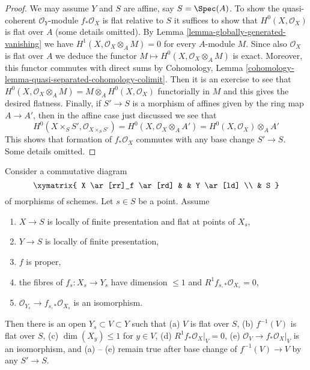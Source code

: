 \begin{proof}
We may assume $Y$ and $S$ are affine, say $S = \Spec(A)$.
To show the quasi-coherent $\mathcal{O}_Y$-module
$f_*\mathcal{O}_X$ is flat relative to $S$ it suffices
to show that $H^0(X, \mathcal{O}_X)$ is flat over $A$
(some details omitted).
By Lemma \ref{lemma-globally-generated-vanishing} we have
$H^1(X, \mathcal{O}_X \otimes_A M) = 0$ for every $A$-module $M$.
Since also $\mathcal{O}_X$ is flat over $A$ we deduce the functor
$M \mapsto H^0(X, \mathcal{O}_X \otimes_A M)$ is exact.
Moreover, this functor commutes with direct sums by
Cohomology, Lemma \ref{cohomology-lemma-quasi-separated-cohomology-colimit}.
Then it is an exercise to see that
$H^0(X, \mathcal{O}_X \otimes_A M) = M \otimes_A H^0(X, \mathcal{O}_X)$
functorially in $M$ and this gives the desired flatness.
Finally, if $S' \to S$ is a morphism of affines given by
the ring map $A \to A'$, then in the affine case just discussed
we see that
$$
H^0(X \times_S S', \mathcal{O}_{X \times_S S'}) =
H^0(X, \mathcal{O}_X \otimes_A A') = H^0(X, \mathcal{O}_X) \otimes_A A'
$$
This shows that formation of $f_*\mathcal{O}_X$ commutes
with any base change $S' \to S$. Some details omitted.
\end{proof}

\begin{lemma}
\label{lemma-h1-fibre-zero-isom}
Consider a commutative diagram
$$
\xymatrix{
X \ar[rr]_f \ar[rd] & & Y \ar[ld] \\
& S
}
$$
of morphisms of schemes. Let $s \in S$ be a point. Assume
\begin{enumerate}
\item $X \to S$ is locally of finite presentation and flat at
points of $X_s$,
\item $Y \to S$ is locally of finite presentation,
\item $f$ is proper,
\item the fibres of $f_s : X_s \to Y_s$ have dimension $\leq 1$
and $R^1f_{s, *}\mathcal{O}_{X_s} = 0$,
\item $\mathcal{O}_{Y_s} \to f_{s, *}\mathcal{O}_{X_s}$ is an isomorphism.
\end{enumerate}
Then there is an open $Y_s \subset V \subset Y$ such that
(a) $V$ is flat over $S$,
(b) $f^{-1}(V)$ is flat over $S$,
(c) $\dim(X_y) \leq 1$ for $y \in V$,
(d) $R^1f_*\mathcal{O}_X|_V = 0$,
(e) $\mathcal{O}_V \to f_*\mathcal{O}_X|_V$
is an isomorphism, and (a) -- (e)
remain true after base change of $f^{-1}(V) \to V$ by any $S' \to S$.
\end{lemma}

